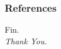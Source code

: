 \documentclass{beamer}
\begin{document}
\begin{frame}[allowframebreaks]
    \justifying
    \frametitle{References}
    \printbibliography
\end{frame}
\begin{frame}
    \centering
    \begin{center}
        {\Huge\calligra Fin.}\\ \vspace*{2em}
        \Huge\emph{Thank You.}
    \end{center}
\end{frame}
\end{document}
